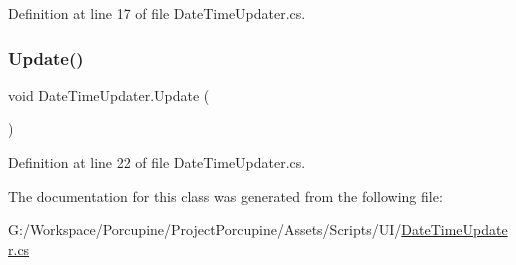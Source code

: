Definition at line 17 of file Date\+Time\+Updater.\+cs.

\mbox{\label{class_date_time_updater_a74fd4bc0faae063f9aedb141f2951549}} 
\subsubsection{\texorpdfstring{Update()}{Update()}}
{\footnotesize\ttfamily void Date\+Time\+Updater.\+Update (\begin{DoxyParamCaption}{ }\end{DoxyParamCaption})}



Definition at line 22 of file Date\+Time\+Updater.\+cs.



The documentation for this class was generated from the following file\+:\begin{DoxyCompactItemize}
\item 
G\+:/\+Workspace/\+Porcupine/\+Project\+Porcupine/\+Assets/\+Scripts/\+U\+I/\hyperlink{_date_time_updater_8cs}{Date\+Time\+Updater.\+cs}\end{DoxyCompactItemize}
